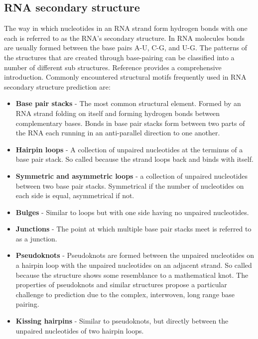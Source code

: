 \documentclass[journal]{IEEEtran}
\begin{document}
\subsection{RNA secondary structure}
\label{subsec:intro-rna-sec-structure}

The way in which nucleotides in an RNA strand form hydrogen bonds with one each is referred to as the RNA's secondary structure. In RNA molecules bonds are usually formed between the base pairs A-U, C-G, and U-G. The patterns of the structures that are created through base-pairing can be classified into a number of different sub structures. Reference \cite{nowakowski1997rna} provides a comprehensive introduction. Commonly encountered structural motifs frequently used in RNA secondary structure prediction are:

\begin{itemize}
	\item \textbf{Base pair stacks} - The most common structural element. Formed by an RNA strand folding on itself and forming hydrogen bonds between complementary bases. Bonds in base pair stacks form between two parts of the RNA each running in an anti-parallel direction to one another. 
	\item \textbf{Hairpin loops} - A collection of unpaired nucleotides at the terminus of a base pair stack. So called because the strand loops back and binds with itself.
	\item \textbf{Symmetric and asymmetric loops} - a collection of unpaired nucleotides between two base pair stacks. Symmetrical if the number of nucleotides on each side is equal, asymmetrical if not.
	\item \textbf{Bulges} - Similar to loops but with one side having no unpaired nucleotides.
	\item \textbf{Junctions} - The point at which multiple base pair stacks meet is referred to as a junction.
	\item \textbf{Pseudoknots} - Pseudoknots are formed between the unpaired nucleotides on a hairpin loop with the unpaired nucleotides on an adjacent strand. So called because the structure shows some resemblance to a mathematical knot. The properties of pseudoknots and similar structures propose a particular challenge to prediction due to the complex, interwoven, long range base pairing.
	\item \textbf{Kissing hairpins} - Similar to pseudoknots, but directly between the unpaired nucleotides of two hairpin loops.
\end{itemize}
\end{document}
